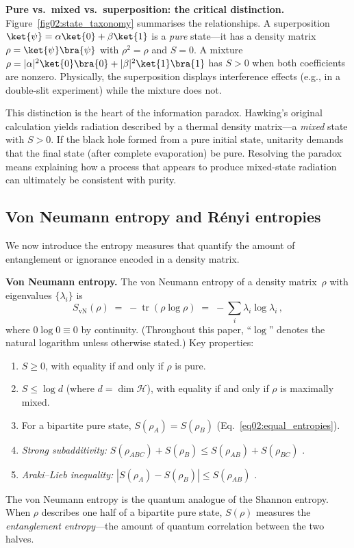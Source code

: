 \documentclass[11pt,letterpaper]{article}
\theoremstyle{plain}
\theoremstyle{definition}
\theoremstyle{remark}
\newcommand{\Hcal}{\mathcal{H}}
\DeclareMathOperator{\tr}{tr}
\begin{document}
\medskip
\noindent\textbf{Pure vs.\ mixed vs.\ superposition: the critical distinction.}
Figure~\ref{fig02:state_taxonomy} summarises the relationships.  A superposition
$\ket{\psi} = \alpha\ket{0}+\beta\ket{1}$ is a \emph{pure} state---it has a density
matrix $\rho=\ket{\psi}\bra{\psi}$ with $\rho^2=\rho$ and $S=0$.  A mixture
$\rho = |\alpha|^2\ket{0}\bra{0} + |\beta|^2\ket{1}\bra{1}$ has $S>0$ when both coefficients are nonzero. Physically,
the superposition displays interference effects (e.g., in a double-slit experiment)
while the mixture does not.

This distinction is the heart of the information paradox.  Hawking's original
calculation \cite{hawking1975} yields radiation described by a thermal density
matrix---a \emph{mixed} state with $S>0$.  If the black hole formed from a pure
initial state, unitarity demands that the final state (after complete evaporation) be
pure.  Resolving the paradox means explaining how a process that appears to produce
mixed-state radiation can ultimately be consistent with purity.

\subsection{Von Neumann entropy and R\'{e}nyi entropies}
\label{subsec02:von_neumann}

We now introduce the entropy measures that quantify the amount of entanglement or
ignorance encoded in a density matrix.

\medskip
\noindent\textbf{Von Neumann entropy.}
The von Neumann entropy of a density matrix~$\rho$ with eigenvalues $\{\lambda_i\}$ is
\begin{equation}\label{eq02:von_neumann}
  S_{\mathrm{vN}}(\rho) \;=\; -\tr(\rho\log\rho)
  \;=\; -\sum_i \lambda_i \log\lambda_i\,,
\end{equation}
where $0\log 0 \equiv 0$ by continuity.  (Throughout this paper, ``$\log$'' denotes
the natural logarithm unless otherwise stated.)  Key properties:
\begin{enumerate}[label=(\alph*),itemsep=2pt]
\item $S\geq 0$, with equality if and only if $\rho$ is pure.
\item $S\leq \log d$ (where $d=\dim\Hcal$), with equality if and only if $\rho$ is
maximally mixed.
\item For a bipartite pure state, $S(\rho_A) = S(\rho_B)$
(Eq.~\eqref{eq02:equal_entropies}).
\item \emph{Strong subadditivity:} $S(\rho_{ABC})+S(\rho_B) \leq
S(\rho_{AB})+S(\rho_{BC})$ \cite{liebruskai1973}.
\item \emph{Araki--Lieb inequality:} $|S(\rho_A)-S(\rho_B)|\leq S(\rho_{AB})$
\cite{arakilieb1970}.
\end{enumerate}
The von Neumann entropy is the quantum analogue of the Shannon entropy.  When $\rho$
describes one half of a bipartite pure state, $S(\rho)$ measures the \emph{entanglement
entropy}---the amount of quantum correlation between the two halves.
\end{document}
